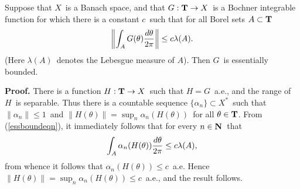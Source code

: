 \begin{essbound}
Suppose that $X$\ is a Banach space, and that $G:\T \to X$\ is a
Bochner integrable function for which there is a constant
$c$\ such that for all Borel sets $A\subset \T$\
\begin{equation}
\left\| \int_A G(\theta) {d\theta\over 2\pi} \right\| \le c \lambda(A) .
\label{essboundeqn}
\end{equation}
(Here $\lambda(A)$\ denotes the Lebesgue measure of $A$).
Then $G$\ is essentially bounded.
\label{essbound}
\end{essbound}
{\bf Proof.}  There is a function $H:\T\to X$\ such that $H = G$\ a.e., and
the range of $H$\ is separable.  Thus there is a countable sequence
$\{\alpha_n\}\subset X^*$\ such that $\|\alpha_n\| \le 1$\ and $\|H(\theta)\| = 
\sup_n \alpha_n(H(\theta))$\ for all $\theta \in \T$.
From (\ref{essboundeqn}), it immediately follows that for
every $n \in \N$\ that
$$ \int_A \alpha_n(H(\theta)) {d\theta\over 2\pi} \le c \lambda(A) ,$$
from whence it follows that $\alpha_n(H(\theta)) \le c$\ a.e.  Hence
$\|H(\theta)\| = \sup_n \alpha_n(H(\theta)) \le c$\ a.e., 
and the result follows.

